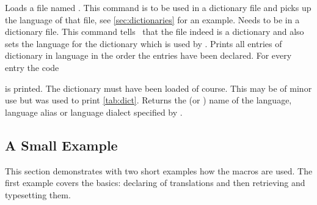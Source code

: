 \documentclass[DIV11,toc=index,toc=bib,numbers=noendperiod]{cnpkgdoc}
\newcommand*\unexpsign{{\tiny\FiveStar}}
\newcommand*\expsign{\textcolor{red}{{\tiny\FiveStar}}}
\renewcommand*\cnpkgdoctriangle{\unexpsign}
\newcommand*\expandable{%
  \def\cnpkgdoctriangle{%
    \expsign
    \gdef\cnpkgdoctriangle{\unexpsign}}}
\begin{document}
\begin{beschreibung}
   Loads a file named .
 \newline
   This command is to be used in a dictionary file and picks up the language
   of that file, see \cref{sec:dictionaries} for an example.
 \newline
   Needs to be in a dictionary file.  This command tells \translations\ that
   the file indeed is a dictionary and also sets the language for the
   dictionary which is used by .
 \expandable{}\newline
   Prints all entries of dictionary  in
   language  in the order the entries have been declared.  For
   every entry the code\par
   \par
   is printed.  The dictionary must have been loaded of course.  This may be
   of minor use but was used to print \cref{tab:dict}.
 \expandable{}\newline
   Returns the  (or ) name
   of the language, language alias or language dialect specified by
   .
\end{beschreibung}

\subsection{A Small Example}
This section demonstrates with two short examples how the macros are used.
The first example covers the basics: declaring of translations and then
retrieving and typesetting them.

\begin{beispiel}
 
 \SaveTranslation{}
 \SaveTranslationFor{}

  \kitchen\ 
 \cuisine
\end{beispiel}
\end{document}
